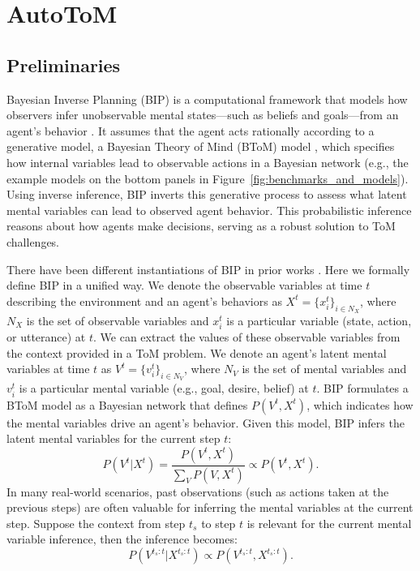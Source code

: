 \section{AutoToM}
\label{method}

\subsection{Preliminaries}
\label{sec:preliminaries}

Bayesian Inverse Planning (BIP) is a computational framework that models how observers infer unobservable mental states—such as beliefs and goals—from an agent's behavior \citep{baker2009action}. It assumes that the agent acts rationally according to a generative model, a Bayesian Theory of Mind (BToM) model \cite{baker2017rational}, which specifies how internal variables lead to observable actions in a Bayesian network (e.g., the example models on the bottom panels in Figure~\ref{fig:benchmarks_and_models}). Using inverse inference, BIP inverts this generative process to assess what latent mental variables can lead to observed agent behavior. This probabilistic inference reasons about how agents make decisions, serving as a robust solution to ToM challenges.

There have been different instantiations of BIP in prior works \citep[e.g.,][]{baker2009action, 
ullman2009help,ong2019computational,jha2024neural}. Here we formally define BIP in a unified way. We denote the observable variables at time $t$ describing the environment and an agent's behaviors as $X^t = \{x_i^t\}_{i \in N_X}$, where $N_X$ is the set of observable variables and $x^t_i$ is a particular variable (state, action, or utterance) at $t$. We can extract the values of these observable variables from the context provided in a ToM problem. We denote an agent's latent mental variables at time $t$ as $V^t = \{v_i^t\}_{i \in N_V}$, where $N_V$ is the set of mental variables and $v^t_i$ is a particular mental variable (e.g., goal, desire, belief) at $t$. BIP formulates a BToM model as a Bayesian network that defines $P(V^t, X^t)$, which indicates how the mental variables drive an agent's behavior. Given this model, BIP infers the latent mental variables for the current step $t$:
\begin{equation}
P(V^{t} | X^{t}) =  \frac{P(V^{t}, X^{t})}{\sum_V P(V, X^{t})} \propto P(V^{t}, X^{t}).
\end{equation}
In many real-world scenarios, past observations (such as actions taken at the previous steps) are often valuable for inferring the mental variables at the current step. Suppose the context from step $t_s$ to step $t$ is relevant for the current mental variable inference, then the inference becomes:
\begin{equation}
P(V^{t_s:t} | X^{t_s:t}) \propto P(V^{t_s:t}, X^{t_s:t}).
\end{equation}

